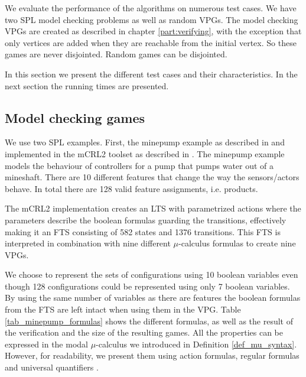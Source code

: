 We evaluate the performance of the algorithms on numerous test cases. We have two SPL model checking problems as well as random VPGs. The model checking VPGs are created as described in chapter \ref{part:verifying}, with the exception that only vertices are added when they are reachable from the initial vertex. So these games are never disjointed. Random games can be disjointed. 

In this section we present the different test cases and their characteristics. In the next section the running times are presented.

\subsection{Model checking games}
We use two SPL examples. First, the minepump example as described in \cite{Kramer1983CONICAI} and implemented in the mCRL2 toolset \cite{mCRL2Toolset} as described in \cite{FamBasedModelCheckingWithMCRL2}. The minepump example models the behaviour of controllers for a pump that pumps water out of a mineshaft. There are 10 different features that change the way the sensors/actors behave. In total there are 128 valid feature assignments, i.e. products. 

The mCRL2 implementation creates an LTS with parametrized actions where the parameters describe the boolean formulas guarding the transitions, effectively making it an FTS consisting of 582 states and 1376 transitions. This FTS is interpreted in combination with nine different $\mu$-calculus formulas to create nine VPGs.

We choose to represent the sets of configurations using 10 boolean variables even though 128 configurations could be represented using only 7 boolean variables. By using the same number of variables as there are features the boolean formulas from the FTS are left intact when using them in the VPG. Table \ref{tab_minepump_formulas} shows the different formulas, as well as the result of the verification and the size of the resulting games. All the properties can be expressed in the modal $\mu$-calculus we introduced in Definition \ref{def_mu_syntax}. However, for readability, we present them using action formulas, regular formulas and universal quantifiers  \cite{Groote}.

